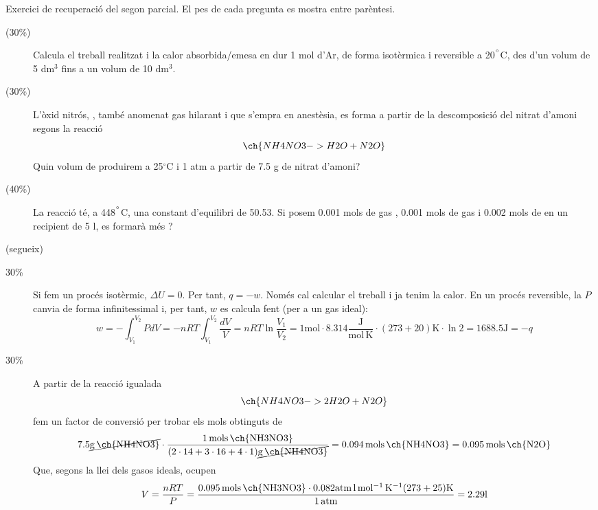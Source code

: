 \documentclass[11pt]{article}
\begin{document}
{Exercici de recuperació del segon parcial. El pes de cada pregunta es mostra entre parèntesi.
\begin{description}
\item[(30\%)] Calcula el treball realitzat i la calor absorbida/emesa en dur 1 mol d'Ar, de forma isotèrmica i reversible a 20$^{\degree}$C, des d'un volum de 5 dm$^3$ fins a un volum de 10 dm$^3$.
\item[(30\%)] L'òxid nitrós, , també anomenat gas hilarant i que s'empra en anestèsia, es forma a partir de la descomposició del nitrat d'amoni segons la reacció
\[\ch{NH4NO3 -> H2O + N2O}\]
Quin volum de  produirem a 25$^{\circ}$C i 1 atm a partir de 7.5 g de nitrat d'amoni?
\item[(40\%)] La reacció  té, a 448$^{\degree}$C, una constant d'equilibri de 50.53. Si posem 0.001 mols de gas , 0.001 mols de gas  i 0.002 mols de  en un recipient de 5 l, es formarà més ?
\end{description}
}
{
\vfill
\newpage (segueix) \newpage
}
{
\begin{description}
\item[30\%] Si fem un procés isotèrmic, $\Delta U=0$. Per tant, $q=-w$. Només cal calcular el treball i ja tenim la calor.
En un procés reversible, la $P$ canvia de forma infinitessimal i, per tant, $w$ es calcula fent (per a un gas ideal):
\[w=-\int_{V_1}^{V_2} P dV=-nRT \int_{V_1}^{V_2} \frac{dV}{V} = nRT \ln \frac{V_1}{V_2} = 1 \mathrm{mol} \cdot 8.314 \frac{\mathrm{J}}{\mathrm{mol \, K}} \cdot (273+20)\mathrm{K} \cdot \ln 2 = 1688.5\mathrm{J}=-q\]

\item[30\%] A partir de la reacció igualada
\[\ch{NH4NO3 -> 2 H2O + N2O}\]
fem un factor de conversió per trobar els mols obtinguts de 
\[7.5 \cancel{\mathrm{g \, \ch{NH4NO3}}} \cdot 
\frac{1 \mathrm{\, mols \, \ch{NH3NO3}}}{(2\cdot 14+3\cdot 16 + 4\cdot 1)\cancel{\mathrm{g \, \ch{NH4NO3}}}}
=0.094 \mathrm{\, mols \, \ch{NH4NO3}}=0.095 \mathrm{\, mols \, \ch{N2O}}
\]
Que, segons la llei dels gasos ideals, ocupen 
\[V=\frac{nRT}{P}=\frac{0.095 \mathrm{\, mols \, \ch{NH3NO3}} \cdot 0.082 \mathrm{atm \, l \, mol^{-1} \, K^{-1}}(273+25)\mathrm{K}}{1 \mathrm{\, atm}}= 2.29 \mathrm{l}\]
\end{description}
}
\end{document}
